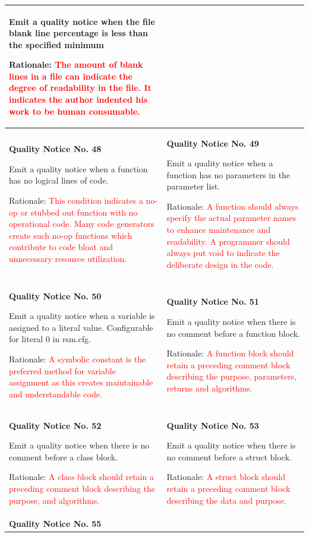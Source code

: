 {\begin{longtable}{||p{}|p{}||}
Emit a quality notice when the file blank line percentage is less than the specified minimum

Rationale: \textcolor{red}{The amount of blank lines in a file can indicate the degree of readability in the file. It indicates the author indented his work to be human consumable.}
    \\
    \hline
        \textbf{Quality Notice No. 48}
        
Emit a quality notice when a function has no logical lines of code. 
 
Rationale: \textcolor{red}{This condition indicates a no-op or stubbed out function with no operational code. Many code generators create such no-op functions which contribute to code bloat and unnecessary resource utilization.}
 & \textbf{Quality Notice No. 49}
 
Emit a quality notice when a function has no parameters in the parameter list.

Rationale:  \textcolor{red}{A function should always specify the actual parameter names to enhance maintenance and readability. A programmer should always put void to indicate the deliberate design in the code.}
    \\
    \hline
        \textbf{Quality Notice No. 50}
         
Emit a quality notice when a variable is assigned to a literal value. Configurable for literal 0 in rsm.cfg. 

Rationale: \textcolor{red}{A symbolic constant is the preferred method for variable assignment as this creates maintainable and understandable code.}
 & \textbf{Quality Notice No. 51}
 
Emit a quality notice when there is no comment before a function block. 
 
Rationale: \textcolor{red}{A function block should retain a preceding comment block describing the purpose, parameters, returns and algorithms.}
    \\
    \hline
     \textbf{Quality Notice No. 52}
     
Emit a quality notice when there is no comment before a class block. 
 
Rationale: \textcolor{red}{A class block should retain a preceding comment block describing the purpose, and algorithms.}
 & \textbf{Quality Notice No. 53}
 
Emit a quality notice when there is no comment before a struct block. 

Rationale: \textcolor{red}{A struct block should retain a preceding comment block describing the data and purpose.}
    \\
    \hline
     \textbf{Quality Notice No. 55}
     

\end{longtable}}
